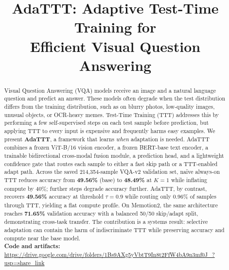 \documentclass[conference]{IEEEtran}
\begin{document}
\title{AdaTTT: Adaptive Test-Time Training for\\
Efficient Visual Question Answering}

\author{
\and
{}
\and
{}
}

\maketitle

\begin{abstract}
Visual Question Answering (VQA) models receive an image and a natural language
question and predict an answer. These models often degrade when the test
distribution differs from the training distribution, such as on blurry photos,
low-quality images, unusual objects, or OCR-heavy memes. Test-Time Training
(TTT) addresses this by performing a few self-supervised steps on each test
sample before prediction, but applying TTT to every input is expensive and
frequently harms easy examples. We present \textbf{AdaTTT}, a framework that
learns \emph{when} adaptation is needed. AdaTTT combines a frozen ViT-B/16
vision encoder, a frozen BERT-base text encoder, a trainable bidirectional
cross-modal fusion module, a prediction head, and a lightweight confidence
gate that routes each sample to either a fast skip path or a TTT-enabled
adapt path. Across the saved 214{,}354-sample VQA-v2 validation set, naïve
always-on TTT reduces accuracy from \textbf{49.56\%} (base) to \textbf{48.49\%}
at $K{=}1$ while inflating compute by 40\%; further steps degrade accuracy
further. AdaTTT, by contrast, recovers \textbf{49.56\%} accuracy at threshold
$\tau{=}0.9$ while routing only 0.96\% of samples through TTT, yielding a
flat compute profile. On Memotion2, the same architecture reaches
\textbf{71.65\%} validation accuracy with a balanced 50/50 skip/adapt split,
demonstrating cross-task transfer. The contribution is a systems result:
selective adaptation can contain the harm of indiscriminate TTT while
preserving accuracy and compute near the base model.\\
\textbf{Code and artifacts:}
\url{https://drive.google.com/drive/folders/1Bs9AXg5yVbtT9In8t2FfW4bA9n3mf0J_?usp=share_link}
\end{abstract}
\end{document}
